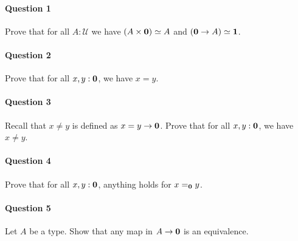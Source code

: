 \documentclass{article}[6pt]%
\newcommand{\U}{{\mathcal U}}
\renewcommand{\r}{\rightarrow}
\newcommand{\one}{{\bf 1}}
\newcommand{\zero}{{\bf 0}}
\begin{document}
\begin{Exercise}[title={The empty type}]

\paragraph{Question 1} Prove that for all $A:\U$ we have $(A\times \zero) \simeq A$ and $(\zero\r A)\simeq \one$.

\paragraph{Question 2} Prove that for all $x,y:\zero$, we have $x=y$.


\paragraph{Question 3} Recall that $x\neq y$ is defined as $x=y\r \zero$. Prove that for all $x,y:\zero$, we have $x\neq y$.

\paragraph{Question 4} Prove that for all $x,y:\zero$, anything holds for $x=_\zero y$.

\paragraph{Question 5} Let $A$ be a type. Show that any map in $A\r \zero$ is an equivalence.


\end{Exercise}
\end{document}
